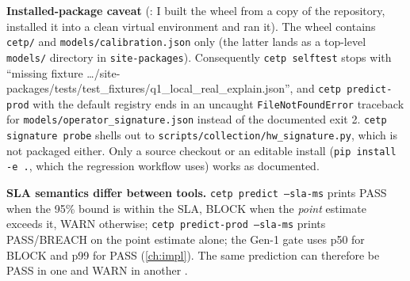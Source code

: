 \textbf{Installed-package caveat} (\evRUN: I built the wheel from a copy of the repository, installed it into a clean virtual environment and ran it). The wheel contains \texttt{cetp/} and \texttt{models/calibration.json} only (the latter lands as a top-level \texttt{models/} directory in \texttt{site-packages}). Consequently \texttt{cetp selftest} stops with ``missing fixture \ldots/site-packages/tests/test\_fixtures/q1\_local\_real\_explain.json'', and \texttt{cetp predict-prod} with the default registry ends in an uncaught \texttt{FileNotFoundError} traceback for \texttt{models/operator\_signature.json} instead of the documented exit 2. \texttt{cetp signature probe} shells out to \texttt{scripts/collection/hw\_signature.py}, which is not packaged either. Only a source checkout or an editable install (\texttt{pip install -e .}, which the regression workflow uses) works as documented.

\textbf{SLA semantics differ between tools.} \texttt{cetp predict --sla-ms} prints PASS when the 95\% bound is within the SLA, BLOCK when the \emph{point} estimate exceeds it, WARN otherwise; \texttt{cetp predict-prod --sla-ms} prints PASS/BREACH on the point estimate alone; the Gen-1 gate uses p50 for BLOCK and p99 for PASS (\cref{ch:impl}). The same prediction can therefore be PASS in one and WARN in another \evCODE.

